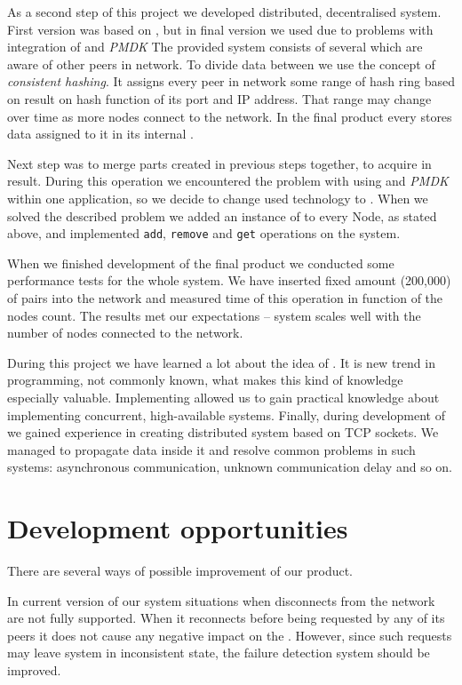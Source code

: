 As a second step of this project we developed distributed, decentralised system.
First version was based on \Seastar, but in final version we used \Asio due to problems with integration of \Seastar and \textit{PMDK}
The provided system consists of several \Nodes which are aware of other peers in network. 
To divide data between \Nodes we use the concept of \textit{consistent hashing}.
It assigns every peer in network some range of hash ring based on result on hash function of its port and IP address. 
That range may change over time as more nodes connect to the network.
In the final product every \Node stores data assigned to it in its internal \PHT. 

Next step was to merge parts created in previous steps together, to acquire \DHTS in result. 
During this operation we encountered the problem with using \Seastar and \textit{PMDK} within one application, so we decide to change used technology to \Asio. 
When we solved the described problem we added an instance of \PHT to every Node, as stated above, and implemented \texttt{add}, \texttt{remove} and \texttt{get} operations on the system.

When we finished development of the final product we conducted some performance tests for the whole system. We have inserted fixed amount (200,000) of pairs \stringsMap into the network and measured time of this operation in function of the nodes count.
The results met our expectations -- system scales well with the number of nodes connected to the network. 

During this project we have learned a lot about the idea of \NVM. It is new trend in programming, not commonly known, what makes this kind of knowledge especially valuable. 
Implementing \PHT allowed us to gain practical knowledge about implementing concurrent, high-available systems. Finally, during development of \DHTS we gained experience in creating distributed system based on TCP sockets. We managed to propagate data inside it and resolve common problems in such systems: asynchronous communication, unknown communication delay and so on.

\section{Development opportunities}

There are several ways of possible improvement of our product.

In current version of our system situations when \Node disconnects from the network are not fully supported.
When it reconnects before being requested by any of its peers it does not cause any negative impact on the \DHTS. 
However, since such requests may leave system in inconsistent state, the failure detection system should be improved.

